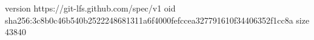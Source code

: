 version https://git-lfs.github.com/spec/v1
oid sha256:3c8b0c46b540b2522248681311a6f4000fefccea327791610f34406352f1cc8a
size 43840
